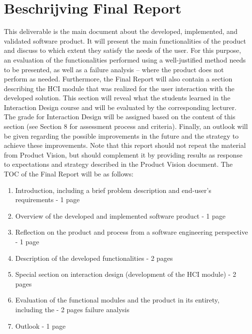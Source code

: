 \documentclass[a4paper]{article}
\begin{document}
\section{Beschrijving Final Report} \label{sec:Referentie}
This deliverable is the main document about the developed, implemented, and validated
software product. It will present the main functionalities of the product and discuss to which
extent they satisfy the needs of the user. For this purpose, an evaluation of the functionalities
performed using a well-justified method needs to be presented, as well as a failure analysis --
where the product does not perform as needed. Furthermore, the Final Report will also
contain a section describing the HCI module that was realized for the user interaction with
the developed solution. This section will reveal what the students learned in the Interaction
Design course and will be evaluated by the corresponding lecturer. The grade for Interaction
Design will be assigned based on the content of this section (see Section 8 for assessment
process and criteria). Finally, an outlook will be given regarding the possible improvements in
the future and the strategy to achieve these improvements.
Note that this report should not repeat the material from Product Vision, but should
complement it by providing results as response to expectations and strategy described in the
Product Vision document. 
The TOC of the Final Report will be as follows:
\begin{enumerate}
\item Introduction, including a brief problem description and end-user's requirements - 1 page
\item Overview of the developed and implemented software product - 1 page
\item Reflection on the product and process from a software engineering perspective - 1 page
\item Description of the developed functionalities - 2 pages
\item Special section on interaction design (development of the HCI module) - 2 pages \label{itm:ite}
\item Evaluation of the functional modules and the product in its entirety, including the - 2 pages
failure analysis
\item Outlook - 1 page
\end{enumerate}
\end{document}
